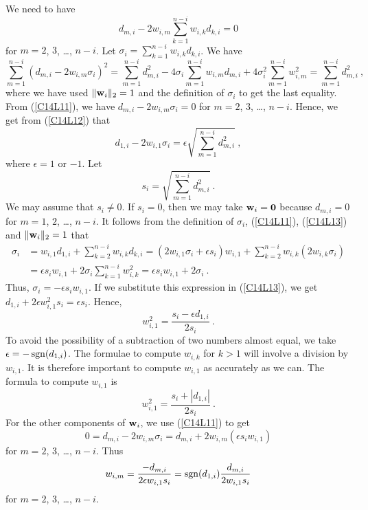 We need to have
\begin{equation}\label{C14L11}
d_{m,i} - 2 w_{i,m} \sum_{k=1}^{n-i} w_{i,k}d_{k,i} = 0
\end{equation}
for $m=2$, $3$, \ldots, $n-i$.  Let
$\displaystyle \sigma_i = \sum_{k=1}^{n-i} w_{i,k}d_{k,i}$.
We have
\begin{equation} \label{C14L12}
\sum_{m=1}^{n-i} \left( d_{m,i} -2 w_{i,m} \sigma_i \right)^2 =
\sum_{m=1}^{n-i} d_{m,i}^2 - 4\sigma_i \sum_{m=1}^{n-i} w_{i,m} d_{m,i}
+4 \sigma_i^2 \sum_{m=1}^{n-i} w_{i,m}^2
= \sum_{m=1}^{n-i} d_{m,i}^2 \ ,
\end{equation}
where we have used $\|\mathbf{w}_i\|_2=1$ and the definition of
$\sigma_i$ to get the last equality.  From (\ref{C14L11}), we have
$d_{m,i} -2 w_{i,m} \sigma_i = 0$ for $m=2$, $3$, \ldots, $n-i$.
Hence, we get from (\ref{C14L12}) that
\begin{equation} \label{C14L13}
d_{1,i} -2 w_{i,1} \sigma_i = \epsilon \sqrt{\sum_{m=1}^{n-i} d_{m,i}^2} \ ,
\end{equation}
where $\epsilon =1$ or $-1$.  Let
\begin{equation}\label{C14L14}
s_i = \sqrt{\sum_{m=1}^{n-i} d_{m,i}^2} \  .
\end{equation}
We may assume that $s_i \neq 0$.  If $s_i=0$, then we may take
$\mathbf{w}_i=\mathbf{0}$ because $d_{m,i}=0$ for $m=1$, $2$, \ldots, $n-i$.
It follows from the definition of $\sigma_i$, (\ref{C14L11}),
(\ref{C14L13}) and $\|\mathbf{w}_i\|_2=1$ that
\begin{align*}
\sigma_i &= w_{i,1}d_{1,i} + \sum_{k=2}^{n-i} w_{i,k}d_{k,i} =
\left( 2 w_{i,1} \sigma_i + \epsilon s_i\right) w_{i,1}
+ \sum_{k=2}^{n-i} w_{i,k} \left( 2 w_{i,k} \sigma_i \right) \\
&= \epsilon s_i w_{i,1} + 2 \sigma_i \sum_{k=1}^{n-i} w_{i,k}^2
= \epsilon s_i w_{i,1} + 2 \sigma_i \ .
\end{align*}
Thus, $\sigma_i = -\epsilon s_i w_{i,1}$.  If we substitute this
expression in (\ref{C14L13}), we get
$d_{1,i} + 2 \epsilon w_{i,1}^2 s_i = \epsilon s_i$.  Hence,
\begin{equation} \label{C14L15}
w_{i,1}^2 = \frac{s_i - \epsilon d_{1,i}}{2s_i} \ .
\end{equation}
To avoid the possibility of a subtraction of two numbers almost equal, we
take $\epsilon = - \operatorname{sgn}(d_{1,i})$.  The formulae to compute $w_{i,k}$
for $k>1$ will involve a division by $w_{i,1}$.  It is therefore
important to compute $w_{i,1}$ as accurately as we can.  The formula
to compute $w_{i,1}$ is
\begin{equation} \label{C14L16}
w_{i,1}^2 = \frac{s_i + \left| d_{1,i} \right|}{2s_i} \ .
\end{equation}
For the other components of $\mathbf{w}_i$, we use (\ref{C14L11}) to get
\[
0 = d_{m,i} - 2 w_{i,m} \sigma_i = d_{m,i} + 2 w_{i,m}
\left( \epsilon s_i w_{i,1} \right)
\]
for  $m=2$, $3$, \ldots, $n-i$.  Thus
\begin{equation} \label{C14L17}
w_{i,m} = \frac{-d_{m,i}}{2 \epsilon w_{i,1} s_i}
= \operatorname{sgn}(d_{1,i}) \frac{d_{m,i}}{2 w_{i,1} s_i}
\end{equation}
for $m=2$, $3$, \ldots, $n-i$.

